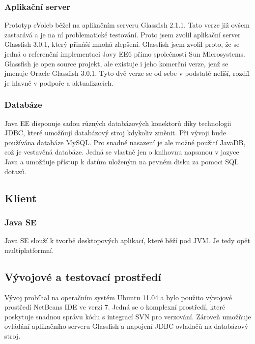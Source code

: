 \documentclass[11pt,twoside,a4paper]{book}
\begin{document}
\subsubsection{Aplikační server} \label{aplikacni_server}

Prototyp eVoleb běžel na aplikačním serveru Glassfish 2.1.1. Tato verze již ovšem zastarává a je na ní problematické testování. Proto jsem zvolil aplikační server Glassfish 3.0.1, který přináší mnohá zlepšení. Glassfish jsem zvolil proto, že se jedná o referenční implementaci Javy EE6 přímo společností Sun Microsystems. Glassfish je open source projekt, ale existuje i jeho komerční verze, jenž se jmenuje Oracle Glassfish 3.0.1. Tyto dvě verze se od sebe v podstatě neliší, rozdíl je hlavně v podpoře a aktualizacích.

\subsubsection{Databáze}

Java EE disponuje sadou různých databázových konektorů díky technologii JDBC, které umožňují databázový stroj kdykoliv změnit. Při vývoji bude používána databáze MySQL. Pro snadné nasazení je ale možné použití JavaDB, což je vestavěná databáze. Jedná se vlastně jen o knihovnu napsanou v jazyce Java a umožňuje přístup k datům uloženým na pevném disku za pomoci SQL dotazů.

\subsection{Klient}

\subsubsection{Java SE}

Java SE slouží k tvorbě desktopových aplikací, které běží pod JVM. Je tedy opět multiplatformní.

\subsection{Vývojové a testovací prostředí}

Vývoj probíhal na operačním systém Ubuntu 11.04 a bylo použito vývojové prostředí NetBeans IDE ve verzi 7. Jedná se o komplexní prostředí, které poskytuje snadnou správu kódu s integrací SVN pro verzování. Zároveň umožňuje ovládání aplikačního serveru Glassfish a napojení JDBC ovladačů na databázový stroj.
\end{document}
